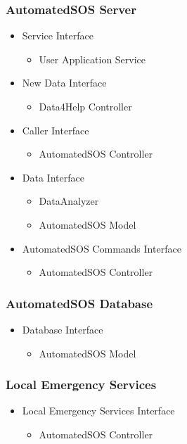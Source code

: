 \documentclass[../../DD.tex]{subfiles}
\begin{document}
		\subsubsection{AutomatedSOS Server}
		\begin{itemize}
			\item Service Interface
			\begin{itemize}
				\item User Application Service 
			\end{itemize}
			\item New Data Interface
			\begin{itemize}
				\item Data4Help Controller
			\end{itemize}
			\item Caller Interface
			\begin{itemize}
				\item AutomatedSOS Controller
			\end{itemize}
			\item Data Interface
			\begin{itemize}
				\item DataAnalyzer
				\item AutomatedSOS Model
			\end{itemize}
			\item AutomatedSOS Commands Interface
			\begin{itemize}
				\item AutomatedSOS Controller
			\end{itemize}
		\end{itemize}

		\subsubsection{AutomatedSOS Database}
		\begin{itemize}
			\item Database Interface
			\begin{itemize}
				\item AutomatedSOS Model
			\end{itemize}
		\end{itemize}

		\subsubsection{Local Emergency Services}
		\begin{itemize}
			\item Local Emergency Services Interface
			\begin{itemize}
				\item AutomatedSOS Controller
			\end{itemize}
		\end{itemize}
		
\end{document}
